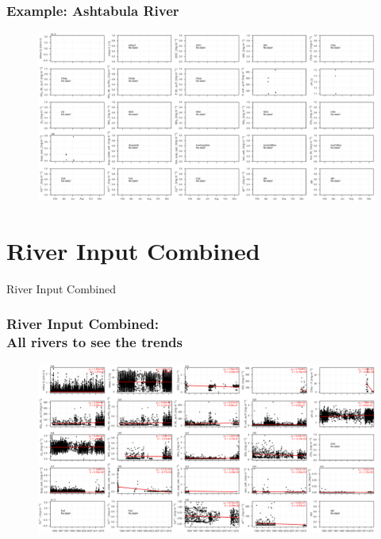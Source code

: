 \documentclass{beamer}
\begin{document}
\begin{frame}
\frametitle{Example: Ashtabula River}
\begin{figure}
\includegraphics[width=\textwidth]{rivers/Central basin/plot_1yr ashtabulariver.png}
\end{figure}
\end{frame}

\section{River Input Combined}

\begin{frame}
\begin{center}
\Huge River Input Combined
\end{center}
\end{frame}



\begin{frame}
\frametitle{River Input Combined: \\ All rivers to see the trends}
\begin{figure}
\includegraphics[width=\textwidth]{rivers/all/all_years all_rivers_subplots.png}
\end{figure}
\end{frame}
\end{document}
